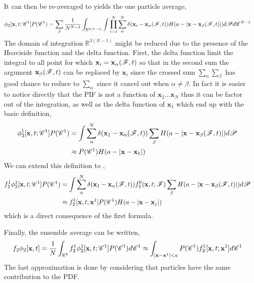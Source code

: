 It can then be re-averaged to yields the one particle average, 
\begin{equation}
    \phi_2[\textbf{x},t;\mathscr{C}^1]P(\mathscr{C}^1)
    =     
    \sum_\beta
    \frac{1}{N^{N-1}}
    \int_{\mathbb{R}^{3(N-1)}} 
    \int 
    \prod_{i=1}^{N}\sum_{\alpha}^{N}\delta(\textbf{x}_i - \textbf{x}_\alpha(\mathscr{F},t)) 
    H(a - |\textbf{x} -\textbf{x}_\beta(\mathscr{F},t)|)
    d\mathscr{P}
    d\mathscr{C}^{N-1}
\end{equation}
The domain of integration $\mathbb{R}^{3(N-1)}$ might be reduced due to the presence of the Heaviside function and the delta function. 
First, the delta function limit the integral to all point for which $\textbf{x}_i = \textbf{x}_\alpha(\mathscr{F},t)$ so that in the second sum the argument $\textbf{x}_\beta(\mathscr{F},t)$ can be replaced by $\textbf{x}_i$ since the crossed sum $\sum_\alpha\sum_\beta$ has good chance to reduce to $\sum_\alpha$ since it cancel out when $\alpha\neq\beta$. 
In fact it is easier to notice directly that the PIF is not a function of $\textbf{x}_2\ldots\textbf{x}_{N}$ thus it can be factor out of the integration, as well as the delta function of $\textbf{x}_1$ which end up with the basic definition, 
\begin{align*}
    \phi_2^1[\textbf{x},t;\mathscr{C}^1]P(\mathscr{C}^1)
    &=     
    \int 
    \sum_{\alpha}^{N}\delta(\textbf{x}_1 - \textbf{x}_\alpha(\mathscr{F},t)) 
    \sum_\beta
    H(a - |\textbf{x} -\textbf{x}_\beta(\mathscr{F},t)|)
    d\mathscr{P}\\
    &\approx
    P(\mathscr{C}^1) 
     H(a - |\textbf{x} - \textbf{x}_1|)
\end{align*}
We can extend this definition to ,
\begin{align*}
    f_2^1\phi_2^1[\textbf{x},t;\mathscr{C}^1]P(\mathscr{C}^1)
    &=     
    \int 
    \sum_{\alpha}^{N}\delta(\textbf{x}_1 - \textbf{x}_\alpha(\mathscr{F},t)) 
    f_2^0(\textbf{x},t;\mathscr{F})
    \sum_\beta 
    H(a - |\textbf{x} -\textbf{x}_\beta(\mathscr{F},t)|) 
    d\mathscr{P}\\
    &
    \approx
    f^1_2[\textbf{x},t;\textbf{x}^1]
    P(\mathscr{C}^1)  H(a - |\textbf{x} - \textbf{x}_j|)
\end{align*}
which is a direct consequence of the first formula. 

Finally, the ensemble average can be written,  
\begin{equation}
    f_2\phi_2[\textbf{x},t]
    =\frac{1}{N} 
    \int_{\mathbb{R}^3} 
    f^1_2\phi_2^1[\textbf{x},t;\mathscr{C}^1]
    P(\mathscr{C}^1)
    d\mathscr{C}^1
    \approx
    \int_{|\textbf{x} - \textbf{x}^1| < a} 
    P(\mathscr{C}^1)
    f_2^1[\textbf{x},t;\textbf{x}^1]
    d\mathscr{C}^1
\end{equation}
The last approximation is done by considering that particles have the same contribution to the PDF. 

